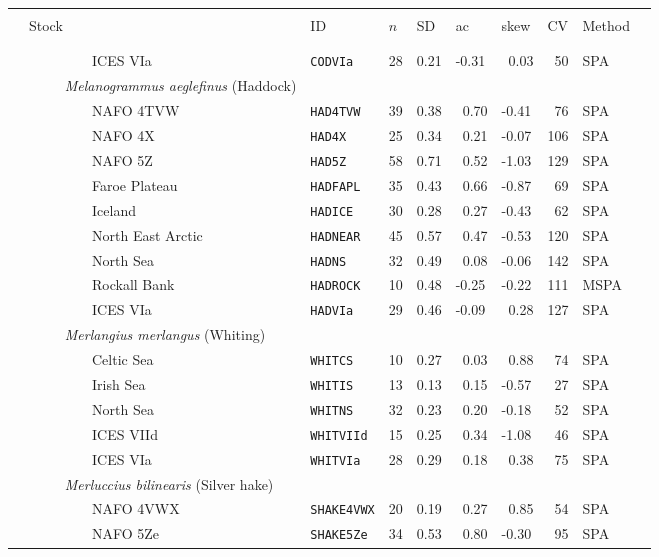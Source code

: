 \newpage
\begin{flushleft}
\begin{tabular*}{7.1in}{llllllllll} 
\hline \\ 
&{\normalsize Stock}&{\normalsize ID}&{\normalsize $n$}&{\normalsize SD}&{\normalsize ac}&{\normalsize skew}&{\normalsize CV}&{\normalsize Method}  & \\ 
 &&&&&&&&&\\ 
  \hline  &&&&&&&&&\\ 
&~~~~~~~~~ICES VIa&{\tt CODVIa}&28&0.21&-0.31&~0.03&~50&SPA  & \\ 
&{\it~~~~~Melanogrammus aeglefinus} (Haddock)&~&~&~&~&~&~&~  & \\ 
&~~~~~~~~~NAFO 4TVW&{\tt HAD4TVW}&39&0.38&~0.70&-0.41&~76&SPA  & \\ 
&~~~~~~~~~NAFO 4X&{\tt HAD4X}&25&0.34&~0.21&-0.07&106&SPA  & \\ 
&~~~~~~~~~NAFO 5Z&{\tt HAD5Z}&58&0.71&~0.52&-1.03&129&SPA  & \\ 
&~~~~~~~~~Faroe Plateau&{\tt HADFAPL}&35&0.43&~0.66&-0.87&~69&SPA  & \\ 
&~~~~~~~~~Iceland&{\tt HADICE}&30&0.28&~0.27&-0.43&~62&SPA  & \\ 
&~~~~~~~~~North East Arctic&{\tt HADNEAR}&45&0.57&~0.47&-0.53&120&SPA  & \\ 
&~~~~~~~~~North Sea&{\tt HADNS}&32&0.49&~0.08&-0.06&142&SPA  & \\ 
&~~~~~~~~~Rockall Bank&{\tt HADROCK}&10&0.48&-0.25&-0.22&111&MSPA  & \\ 
&~~~~~~~~~ICES VIa&{\tt HADVIa}&29&0.46&-0.09&~0.28&127&SPA  & \\ 
&{\it~~~~~Merlangius merlangus} (Whiting)&~&~&~&~&~&~&~  & \\ 
&~~~~~~~~~Celtic Sea&{\tt WHITCS}&10&0.27&~0.03&~0.88&~74&SPA  & \\ 
&~~~~~~~~~Irish Sea&{\tt WHITIS}&13&0.13&~0.15&-0.57&~27&SPA  & \\ 
&~~~~~~~~~North Sea&{\tt WHITNS}&32&0.23&~0.20&-0.18&~52&SPA  & \\ 
&~~~~~~~~~ICES VIId&{\tt WHITVIId}&15&0.25&~0.34&-1.08&~46&SPA  & \\ 
&~~~~~~~~~ICES VIa&{\tt WHITVIa}&28&0.29&~0.18&~0.38&~75&SPA  & \\ 
&{\it~~~~~Merluccius bilinearis} (Silver hake)&~&~&~&~&~&~&~  & \\ 
&~~~~~~~~~NAFO 4VWX&{\tt SHAKE4VWX}&20&0.19&~0.27&~0.85&~54&SPA  & \\ 
&~~~~~~~~~NAFO 5Ze&{\tt SHAKE5Ze}&34&0.53&~0.80&-0.30&~95&SPA  & \\ 

\end{tabular*}
\end{flushleft}
